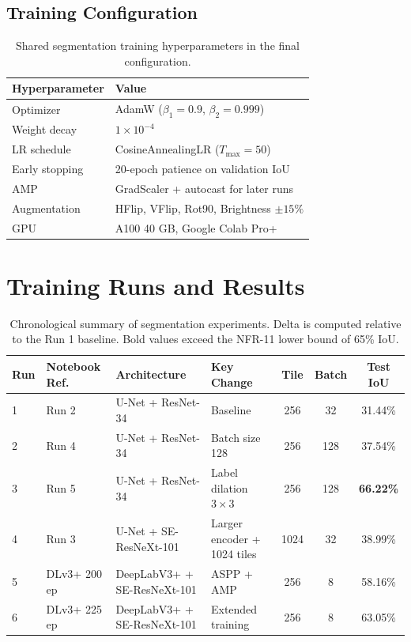 ﻿\documentclass[conference]{IEEEtran}
\begin{document}
\subsection{Training Configuration}
\begin{table}[!t]
\caption{Shared segmentation training hyperparameters in the final configuration.}
\centering
\begin{tabular}{ll}
\toprule
\textbf{Hyperparameter} & \textbf{Value} \\
\midrule
Optimizer & AdamW ($\beta_1=0.9$, $\beta_2=0.999$) \\
Weight decay & $1\times10^{-4}$ \\
LR schedule & CosineAnnealingLR ($T_{\max}=50$) \\
Early stopping & 20-epoch patience on validation IoU \\
AMP & GradScaler + autocast for later runs \\
Augmentation & HFlip, VFlip, Rot90, Brightness $\pm15\%$ \\
GPU & A100 40 GB, Google Colab Pro+ \\
\bottomrule
\end{tabular}
\end{table}

\section{Training Runs and Results}
\begin{table}[!t]
\caption{Chronological summary of segmentation experiments. Delta is computed relative to the Run 1 baseline. Bold values exceed the NFR-11 lower bound of 65\% IoU.}
\centering
\begin{tabular}{llllccc}
\toprule
\textbf{Run} & \textbf{Notebook Ref.} & \textbf{Architecture} & \textbf{Key Change} & \textbf{Tile} & \textbf{Batch} & \textbf{Test IoU} \\
\midrule
1 & Run 2 & U-Net + ResNet-34 & Baseline & 256 & 32 & 31.44\% \\
2 & Run 4 & U-Net + ResNet-34 & Batch size 128 & 256 & 128 & 37.54\% \\
3 & Run 5 & U-Net + ResNet-34 & Label dilation $3\times3$ & 256 & 128 & \textbf{66.22\%} \\
4 & Run 3 & U-Net + SE-ResNeXt-101 & Larger encoder + 1024 tiles & 1024 & 32 & 38.99\% \\
5 & DLv3+ 200 ep & DeepLabV3+ + SE-ResNeXt-101 & ASPP + AMP & 256 & 8 & 58.16\% \\
6 & DLv3+ 225 ep & DeepLabV3+ + SE-ResNeXt-101 & Extended training & 256 & 8 & 63.05\% \\
\bottomrule
\end{tabular}
\end{table}
\end{document}
